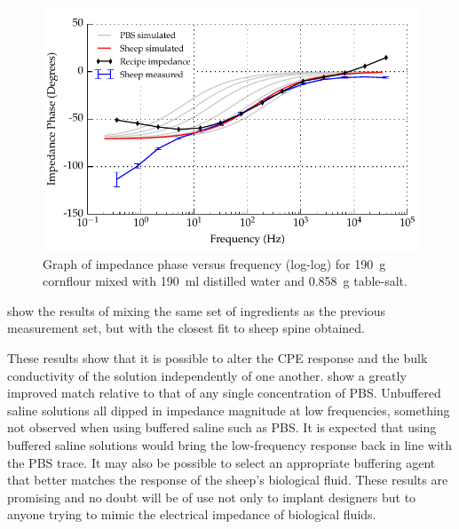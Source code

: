   \begin{figure}
      \centering
      \includegraphics[width=\textwidth]{content/pt2/graphics/run12_190ml-distilledWater_190g-cornflour_0g858-salt_ZVsF_graph_phase}
      \caption{\label{fig:recipe_cornflour_salt_extraWater_phase_improved}Graph of impedance phase versus frequency (log-log) for \SI{190}{\gram} cornflour mixed with \SI{190}{\milli\litre} distilled water and \SI{0.858}{\gram} table-salt.}
  \end{figure}

   show the results of mixing the same set of ingredients as the previous measurement set, but with the closest fit to sheep spine obtained.




  These results show that it is possible to alter the CPE response and the bulk conductivity of the solution independently of one another.
   show a greatly improved match relative to that of any single concentration of PBS.
  Unbuffered saline solutions all dipped in impedance magnitude at low frequencies, something not observed when using buffered saline such as PBS.
  It is expected that using buffered saline solutions would bring the low-frequency response back in line with the PBS trace.
  It may also be possible to select an appropriate buffering agent that better matches the response of the sheep's biological fluid.
  These results are promising and no doubt will be of use not only to implant designers but to anyone trying to mimic the electrical impedance of biological fluids.
